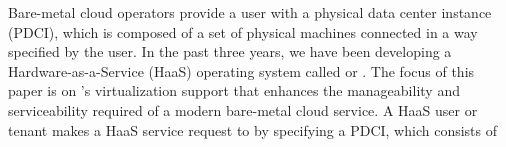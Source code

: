 Bare-metal cloud operators provide a user with a physical data center instance (PDCI), which is 
composed of a set of physical machines connected in a way specified by the user. 
In the past three years, we have been developing a Hardware-as-a-Service (HaaS) operating system called \fullname or \sna.  
The focus of this paper is on \sna's virtualization support that enhances the manageability and serviceability required of a modern bare-metal cloud service. 
A HaaS user or tenant makes a HaaS service request to \na by specifying a PDCI, which consists of 

